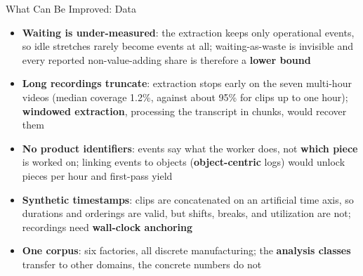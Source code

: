 \documentclass[aspectratio=169]{beamer}
\newcommand{\keyc}[1]{\textbf{\textcolor{egoblue}{#1}}}
\newcommand{\keyg}[1]{\textbf{\textcolor{egogreen!70!black}{#1}}}
\newcommand{\keya}[1]{\textbf{\textcolor{egoamber!85!black}{#1}}}
\begin{document}
\begin{frame}{What Can Be Improved: Data}
  \small
  \begin{itemize}\setlength{\itemsep}{8pt}
    \item \keya{Waiting is under-measured}: the extraction keeps only
      operational events, so idle stretches rarely become events at all;
      waiting-as-waste is invisible and every reported non-value-adding share
      is therefore a \keyc{lower bound}
    \item \keya{Long recordings truncate}: extraction stops early on the seven
      multi-hour videos (median coverage 1.2\%, against about 95\% for clips
      up to one hour); \keyc{windowed extraction}, processing the transcript
      in chunks, would recover them
    \item \keya{No product identifiers}: events say what the worker does, not
      \keyg{which piece} is worked on; linking events to objects
      (\keyc{object-centric} logs) would unlock pieces per hour and
      first-pass yield
    \item \keya{Synthetic timestamps}: clips are concatenated on an artificial
      time axis, so durations and orderings are valid, but shifts, breaks, and
      utilization are not; recordings need \keyc{wall-clock anchoring}
    \item \keya{One corpus}: six factories, all discrete manufacturing;
      the \keyc{analysis classes} transfer to other domains,
      the concrete numbers do not
  \end{itemize}
\end{frame}
\end{document}

